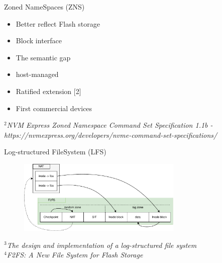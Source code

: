 \documentclass{beamer}
\begin{document}
\begin{frame}{Zoned NameSpaces (ZNS)}
	\begingroup
	\small
	\begin{itemize}
		\item Better reflect Flash storage
		\item Block interface
		\item The semantic gap
		\item host-managed
		\item Ratified extension [2]
		\item First commercial devices
	\end{itemize}
	\textit{\tiny $^{2}$NVM Express Zoned Namespace Command Set Specification 1.1b - 
	https://nvmexpress.org/developers/nvme-command-set-specifications/}
	\endgroup
\end{frame}

\begin{frame}{Log-structured FileSystem (LFS)}
	\begingroup
	\small
	\begin{figure}
		\centering
		\includegraphics[width=0.7\textwidth]{resources/images/f2fs-nat.pdf}
	\end{figure}
	\textit{\tiny $^{3}$The design and implementation of a log-structured file system \\}
	\textit{\tiny $^{4}$F2FS: A New File System for Flash Storage}
	\endgroup
\end{frame}
\end{document}
